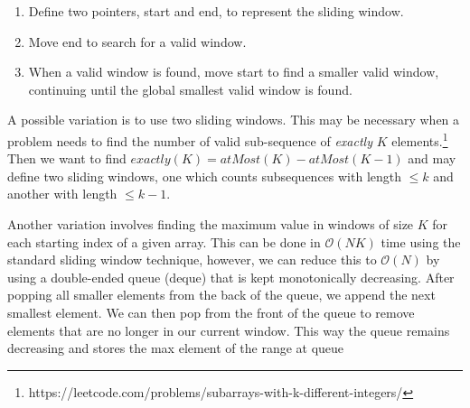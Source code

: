 \documentclass{article}
\newcommand{\comment}[1]{}
\newcommand{\bigO}{\mathcal{O}}
\begin{document}
    \begin{enumerate}
        \item Define two pointers, start and end, to represent the sliding window.
        \item Move end to search for a valid window.
        \item When a valid window is found, move start to find a smaller valid window, continuing until the global smallest valid window is found.
    \end{enumerate}
    
    A possible variation is to use two sliding windows. This may be necessary when a problem needs to find the number of valid sub-sequence of \textit{exactly} $K$ elements.\footnote{https://leetcode.com/problems/subarrays-with-k-different-integers/} Then we want to find $exactly(K) = atMost(K) - atMost(K-1)$ and may define two sliding windows, one which counts subsequences with length $\leq k$ and another with length $\leq k-1$.
    
    \comment{
    # Using monotonic double-ended queues
    def longest_valid_subarray(A, limit):
        maxdq = collections.deque()
        mindq = collections.deque()
        i = 0 
        for a in A:
            while len(maxdq) and a > maxdq[-1]: maxdq.pop()
            while len(mindq) and a < mindq[-1]: mindq.pop()
            maxdq.append(a)
            mindq.append(a)
            if maxdq[0] - mindq[0] > limit:
                if maxdq[0] == A[i]: maxdq.popleft()
                if mindq[0] == A[i]: mindq.popleft()
                i += 1
        return len(A) - i
        
    Another challenging variation involves finding the length of a window in which the absolute difference is maximized but under a given limit.\footnote{https://leetcode.com/problems/longest-continuous-subarray-with-absolute-diff-less-than-or-equal-to-limit/} In this case, we maintain two double-ended queues (deque), one of minimums that is kept monotonically increasing and the other of maximums that is kept monotonically decreasing. After appending elements on to the end of both queues while maintaining monotonic order, we then update the front of the deques so that the difference between their first elements does not exceede the given limit, incrementing a counter if we popleft. This counter corresponds to the left pointer of a sliding window and we want the max valid window.
    }
    
    Another variation involves finding the maximum value in windows of size $K$ for each starting index of a given array. This can be done in $\bigO(NK)$ time using the standard sliding window technique, however, we can reduce this to $\bigO(N)$ by using a double-ended queue (deque) that is kept monotonically decreasing. After popping all smaller elements from the back of the queue, we append the next smallest element. We can then pop from the front of the queue to remove elements that are no longer in our current window. This way the queue remains decreasing and stores the max element of the range at queue
\end{document}
